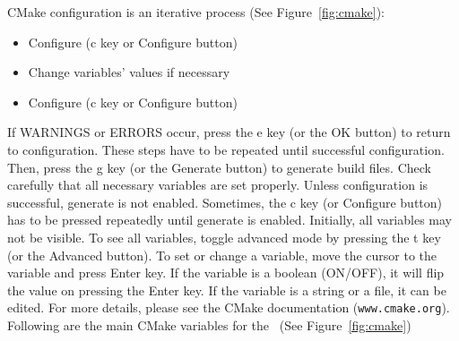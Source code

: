 CMake configuration is an iterative process (See Figure~\ref{fig:cmake}):
\begin{itemize}
\item Configure (c key or Configure button)
\item Change variables' values if necessary
\item Configure (c key or Configure button)
\end{itemize}

If WARNINGS or ERRORS occur, press the e key (or the OK button) to return to configuration. These steps have to be repeated until successful configuration. Then, press the g key (or the Generate button) to generate build files. Check carefully that all necessary variables are set properly. Unless configuration is successful, generate is not enabled. Sometimes, the c key (or Configure button) has to be pressed repeatedly until generate is enabled. Initially, all variables may not be visible. To see all variables, toggle advanced mode by pressing the t key (or the Advanced button).
To set or change a variable, move the cursor to the variable and press Enter key. If the variable is a boolean (ON/OFF), it will flip the value on pressing the Enter key. If the variable is a string or a file, it can be edited. For more details, please see the CMake documentation (\texttt{www.cmake.org}).
\\

Following are the main CMake variables for the \pack\ (See Figure~\ref{fig:cmake})


